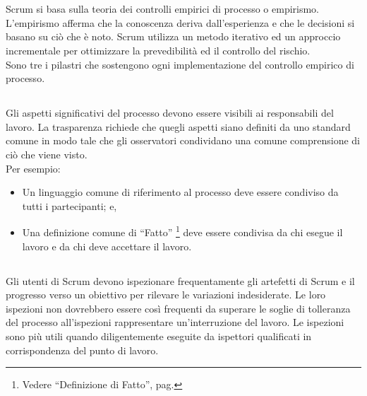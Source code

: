 
\section*{\color{Blue}{La Teoria di Scrum}}%
\label{sec:scrum_theory}
Scrum si basa sulla teoria dei controlli empirici di processo o empirismo. L'empirismo afferma che la conoscenza deriva dall'esperienza e 
che le decisioni si basano su ci\`o che \`e noto. Scrum utilizza un metodo iterativo ed un approccio incrementale per ottimizzare la 
prevedibilit\`a ed il controllo del rischio. 
\newline
\\Sono tre i pilastri che sostengono ogni implementazione del controllo empirico di processo.

\subsection*{\color{SteelBlue}{Trasparenza}}%
\label{sec:transparency}
Gli aspetti significativi  del processo devono essere visibili ai responsabili del lavoro. La trasparenza richiede che quegli aspetti siano 
definiti da uno standard comune in modo tale che gli osservatori condividano una comune comprensione di ci\`o che viene visto.
\newline
\\Per esempio:
\begin{itemize}
	\item Un linguaggio comune di riferimento al processo deve essere condiviso da tutti i partecipanti; e,
	\item Una definizione comune di ``Fatto'' \footnote[1]{Vedere ``Definizione di Fatto'', pag. \pageref{sec:definition_of_done}} deve essere condivisa da chi esegue il lavoro e da chi deve accettare il lavoro.
\end{itemize}

\subsection*{\color{SteelBlue}{Ispezione}}%
\label{sec:inspection}
Gli utenti di Scrum devono ispezionare frequentamente gli artefetti di Scrum e il progresso verso un obiettivo per rilevare le variazioni
indesiderate. Le loro ispezioni non dovrebbero essere cos\`i frequenti da superare le soglie di tolleranza del processo all'ispezioni
rappresentare un'interruzione del lavoro. Le ispezioni sono pi\`u utili quando diligentemente eseguite da ispettori qualificati in 
corrispondenza del punto di lavoro.

